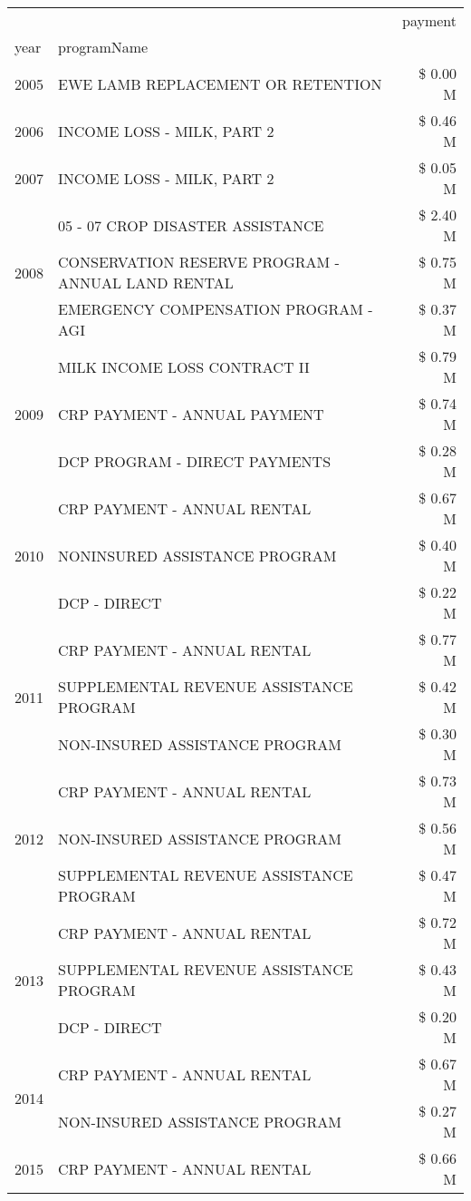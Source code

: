 \begin{tabular}{llr}
\toprule
 &  & payment \\
year & programName &  \\
\midrule
2005 & EWE LAMB REPLACEMENT OR RETENTION & \$ 0.00 M \\
\cline{1-3}
2006 & INCOME LOSS - MILK, PART 2 & \$ 0.46 M \\
\cline{1-3}
2007 & INCOME LOSS - MILK, PART 2 & \$ 0.05 M \\
\cline{1-3}
\multirow[t]{3}{*}{2008} & 05 - 07 CROP DISASTER ASSISTANCE & \$ 2.40 M \\
 & CONSERVATION RESERVE PROGRAM - ANNUAL LAND RENTAL & \$ 0.75 M \\
 & EMERGENCY COMPENSATION PROGRAM - AGI & \$ 0.37 M \\
\cline{1-3}
\multirow[t]{3}{*}{2009} & MILK INCOME LOSS CONTRACT II & \$ 0.79 M \\
 & CRP PAYMENT - ANNUAL PAYMENT & \$ 0.74 M \\
 & DCP PROGRAM - DIRECT PAYMENTS & \$ 0.28 M \\
\cline{1-3}
\multirow[t]{3}{*}{2010} & CRP PAYMENT - ANNUAL RENTAL & \$ 0.67 M \\
 & NONINSURED ASSISTANCE PROGRAM & \$ 0.40 M \\
 & DCP - DIRECT & \$ 0.22 M \\
\cline{1-3}
\multirow[t]{3}{*}{2011} & CRP PAYMENT - ANNUAL RENTAL & \$ 0.77 M \\
 & SUPPLEMENTAL REVENUE ASSISTANCE PROGRAM & \$ 0.42 M \\
 & NON-INSURED ASSISTANCE PROGRAM & \$ 0.30 M \\
\cline{1-3}
\multirow[t]{3}{*}{2012} & CRP PAYMENT - ANNUAL RENTAL & \$ 0.73 M \\
 & NON-INSURED ASSISTANCE PROGRAM & \$ 0.56 M \\
 & SUPPLEMENTAL REVENUE ASSISTANCE PROGRAM & \$ 0.47 M \\
\cline{1-3}
\multirow[t]{3}{*}{2013} & CRP PAYMENT - ANNUAL RENTAL & \$ 0.72 M \\
 & SUPPLEMENTAL REVENUE ASSISTANCE PROGRAM & \$ 0.43 M \\
 & DCP - DIRECT & \$ 0.20 M \\
\cline{1-3}
\multirow[t]{2}{*}{2014} & CRP PAYMENT - ANNUAL RENTAL & \$ 0.67 M \\
 & NON-INSURED ASSISTANCE PROGRAM & \$ 0.27 M \\
\cline{1-3}
\multirow[t]{3}{*}{2015} & CRP PAYMENT - ANNUAL RENTAL & \$ 0.66 M \\

\end{tabular}
